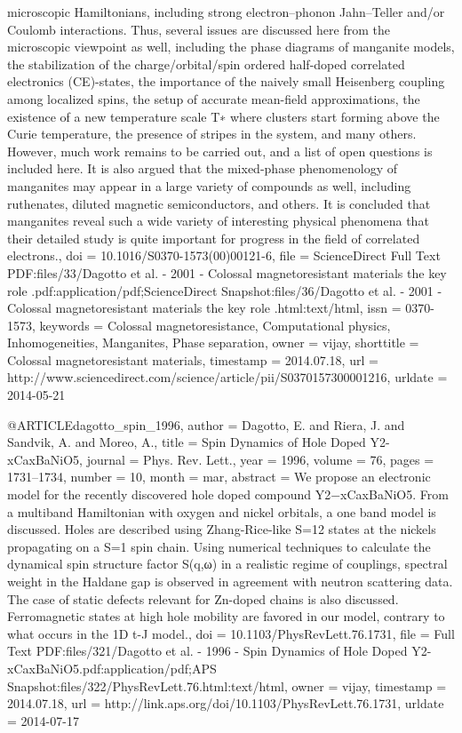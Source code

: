 {{	microscopic Hamiltonians, including strong electron–phonon {Jahn–Teller}
	and/or Coulomb interactions. Thus, several issues are discussed here
	from the microscopic viewpoint as well, including the phase diagrams
	of manganite models, the stabilization of the charge/orbital/spin
	ordered half-doped correlated electronics ({CE)-states}, the importance
	of the naively small Heisenberg coupling among localized spins, the
	setup of accurate mean-field approximations, the existence of a new
	temperature scale T∗ where clusters start forming above the Curie
	temperature, the presence of stripes in the system, and many others.
	However, much work remains to be carried out, and a list of open
	questions is included here. It is also argued that the mixed-phase
	phenomenology of manganites may appear in a large variety of compounds
	as well, including ruthenates, diluted magnetic semiconductors, and
	others. It is concluded that manganites reveal such a wide variety
	of interesting physical phenomena that their detailed study is quite
	important for progress in the field of correlated electrons.},
  doi = {10.1016/S0370-1573(00)00121-6},
  file = {ScienceDirect Full Text PDF:files/33/Dagotto et al. - 2001 - Colossal magnetoresistant materials the key role .pdf:application/pdf;ScienceDirect Snapshot:files/36/Dagotto et al. - 2001 - Colossal magnetoresistant materials the key role .html:text/html},
  issn = {0370-1573},
  keywords = {Colossal magnetoresistance, Computational physics, Inhomogeneities,
	Manganites, Phase separation},
  owner = {vijay},
  shorttitle = {Colossal magnetoresistant materials},
  timestamp = {2014.07.18},
  url = {http://www.sciencedirect.com/science/article/pii/S0370157300001216},
  urldate = {2014-05-21}
}

@ARTICLE{dagotto_spin_1996,
  author = {Dagotto, E. and Riera, J. and Sandvik, A. and Moreo, A.},
  title = {Spin Dynamics of Hole Doped Y2-{xCaxBaNiO}5},
  journal = {Phys. Rev. Lett.},
  year = {1996},
  volume = {76},
  pages = {1731--1734},
  number = {10},
  month = mar,
  abstract = {We propose an electronic model for the recently discovered hole doped
	compound Y2−{xCaxBaNiO}5. From a multiband Hamiltonian with oxygen
	and nickel orbitals, a one band model is discussed. Holes are described
	using Zhang-Rice-like S=12 states at the nickels propagating on a
	S=1 spin chain. Using numerical techniques to calculate the dynamical
	spin structure factor S(q,ω) in a realistic regime of couplings,
	spectral weight in the Haldane gap is observed in agreement with
	neutron scattering data. The case of static defects relevant for
	Zn-doped chains is also discussed. Ferromagnetic states at high hole
	mobility are favored in our model, contrary to what occurs in the
	1D t-J model.},
  doi = {10.1103/PhysRevLett.76.1731},
  file = {Full Text PDF:files/321/Dagotto et al. - 1996 - Spin Dynamics of Hole Doped Y2-xCaxBaNiO5.pdf:application/pdf;APS Snapshot:files/322/PhysRevLett.76.html:text/html},
  owner = {vijay},
  timestamp = {2014.07.18},
  url = {http://link.aps.org/doi/10.1103/PhysRevLett.76.1731},
  urldate = {2014-07-17}
}

